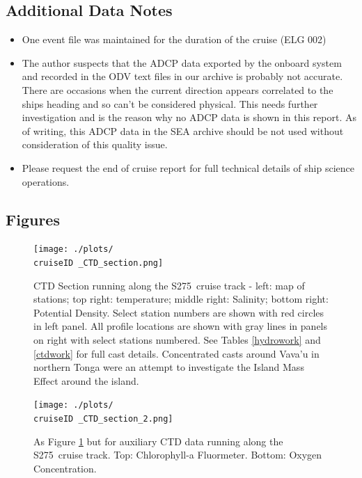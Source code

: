 \documentclass[letterpaper,11pt]{article}
\newcommand{\cruiseID}{S275}
\begin{document}
\subsection*{Additional Data Notes}

\begin{itemize}
 \item One event file was maintained for the duration of the cruise (ELG 002)
 \item The author suspects that the ADCP data exported by the onboard system and recorded in the ODV text files in our archive is probably not accurate. There are occasions when the current direction appears correlated to the ships heading and so can't be considered physical. This needs further investigation and is the reason why no ADCP data is shown in this report. As of writing, this ADCP data in the SEA archive should be not used without consideration of this quality issue.
 \item Please request the end of cruise report for full technical details of ship science operations.
\end{itemize}


\clearpage
\subsection*{Figures}

\begin{figure}[h]
\centering
\texttt{[image: ./plots/\\cruiseID \_CTD\_section.png]}
\caption[CTD Section running along the \cruiseID\ cruise track]{CTD Section running along the \cruiseID\ cruise track - left: map of stations; top right: temperature; middle right: Salinity; bottom right: Potential Density. Select station numbers are shown with red circles in left panel. All profile locations are shown with gray lines in panels on right with select stations numbered. See Tables \ref{hydrowork} and \ref{ctdwork} for full cast details. Concentrated casts around Vava'u in northern Tonga were an attempt to investigate the Island Mass Effect around the island.}
\label{CTD_section}
\end{figure}

\begin{figure}[ht]
\centering
\texttt{[image: ./plots/\\cruiseID \_CTD\_section\_2.png]}
\caption[Auxiliary CTD data running along the \cruiseID\ cruise track]{As Figure \ref{CTD_section} but for auxiliary CTD data running along the \cruiseID\ cruise track. Top: Chlorophyll-a Fluormeter. Bottom: Oxygen Concentration.}
\label{CTD_section_2}
\end{figure}
\end{document}
